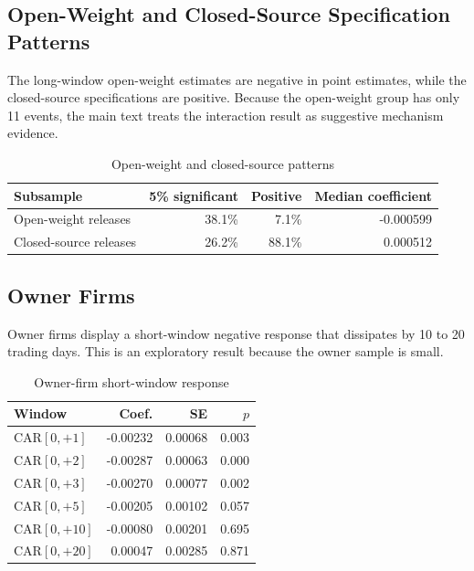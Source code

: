 \documentclass[12pt]{article}
\begin{document}
\subsection{Open-Weight and Closed-Source Specification Patterns}

The long-window open-weight estimates are negative in point estimates, while the
closed-source specifications are positive. Because the open-weight group has only
11 events, the main text treats the interaction result as suggestive mechanism
evidence.

\begin{table}[htbp]
\centering
\caption{Open-weight and closed-source patterns}
\label{tab:a_open_closed}
\begin{tabular}{lrrr}
\toprule
Subsample & 5\% significant & Positive & Median coefficient \\
\midrule
Open-weight releases & 38.1\% & 7.1\% & -0.000599 \\
Closed-source releases & 26.2\% & 88.1\% & 0.000512 \\
\bottomrule
\end{tabular}
\end{table}

\subsection{Owner Firms}

Owner firms display a short-window negative response that dissipates by 10 to 20
trading days. This is an exploratory result because the owner sample is small.

\begin{table}[htbp]
\centering
\caption{Owner-firm short-window response}
\label{tab:a_owner}
\begin{tabular}{lrrr}
\toprule
Window & Coef. & SE & $p$ \\
\midrule
CAR$[0,{+}1]$ & -0.00232 & 0.00068 & 0.003 \\
CAR$[0,{+}2]$ & -0.00287 & 0.00063 & 0.000 \\
CAR$[0,{+}3]$ & -0.00270 & 0.00077 & 0.002 \\
CAR$[0,{+}5]$ & -0.00205 & 0.00102 & 0.057 \\
CAR$[0,{+}10]$ & -0.00080 & 0.00201 & 0.695 \\
CAR$[0,{+}20]$ & 0.00047 & 0.00285 & 0.871 \\
\bottomrule
\end{tabular}
\end{table}
\end{document}
